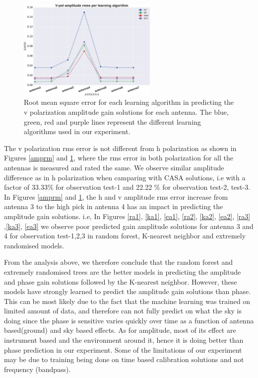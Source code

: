 \begin{figure}[H]
  \centering
    \includegraphics[width=0.6\textwidth]{images/Vpol-amp.eps}
    \caption{Root mean square error for each learning algorithm in predicting the v polarization amplitude gain solutions for each antenna. The blue, green, red and purple lines represent the different learning algorithms used in our experiment.}
  \label{amprmv}
 \end{figure} 

The v polarization rms error is not different from h polarization as shown in Figures \ref{amprm} and \ref{amprmv}, where the rms error in both polarization for all the antennas is measured and rated the same. We observe similar amplitude  difference as in h polarization when camparing with CASA solutions, i.e with a factor of 33.33$\%$ for observation test-1 and 22.22 $\%$ for observation test-2, test-3. In Figures \ref{amprm} and \ref{amprmv}, the h and v amplitude rms error increase from antenna 3 to the high pick in antenna 4 has an impact in predicting the amplitude gain solutions. i.e, In Figures \ref{ra1}, \ref{ka1}, \ref{ea1}, \ref{ra2}, \ref{ka2}, \ref{ea2}, \ref{ra3} ,\ref{ka3}, \ref{ea3} we observe poor predicted gain amplitude solutions for antenna 3 and 4 for observation test-1,2,3 in random forest, K-nearest neighbor and extremely randomised models.

From the analysis above, we therefore conclude that the random forest and extremely randomised trees are the better models in predicting the amplitude and phase gain solutions followed by the K-nearest neighbor. However, these models have strongly learned to predict the amplitude gain solutions than phase. This can be most likely due to the fact that the machine learning was trained on limited amount of data, and therefore can not fully predict on what the sky is doing since the phase is sensitive varies quickly over time as a function of antenna based(ground) and sky based effects.  As for amplitude, most of its effect are instrument based and the environment around it, hence it is doing better than phase prediction in our experiment. Some of the limitations of our experiment may be due to training being done on time based calibration solutions and not frequency (bandpass). 

